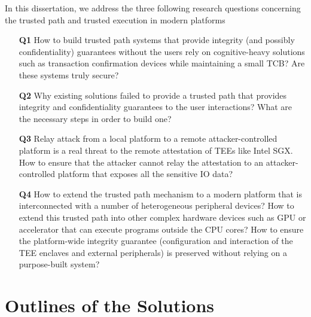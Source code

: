 In this dissertation, we address the three following research questions concerning the trusted path and trusted execution in modern platforms 
\begin{enumerate}
  
  	\item[\textbf{Q1}] How to build trusted path systems that provide integrity (and possibly confidentiality) guarantees without the users rely on cognitive-heavy solutions such as transaction confirmation devices while maintaining a small TCB? Are these systems truly secure?
  	
    \item[\textbf{Q2}] Why existing solutions failed to provide a trusted path that provides integrity and confidentiality guarantees to the user interactions? What are the necessary steps in order to build one?
    
    \item[\textbf{Q3}] Relay attack from a local platform to a remote attacker-controlled platform is a real threat to the remote attestation of TEEs like Intel SGX. How to ensure that the attacker cannot relay the attestation to an attacker-controlled platform that exposes all the sensitive IO data?
    
    \item[\textbf{Q4}] How to extend the trusted path mechanism to a modern platform that is interconnected with a number of heterogeneous peripheral devices? How to extend this trusted path into other complex hardware devices such as GPU or accelerator that can execute programs outside the CPU cores? How to ensure the platform-wide integrity guarantee (configuration and interaction of the TEE enclaves and external peripherals) is preserved without relying on a purpose-built system?  
\end{enumerate}


\section{Outlines of the Solutions}

